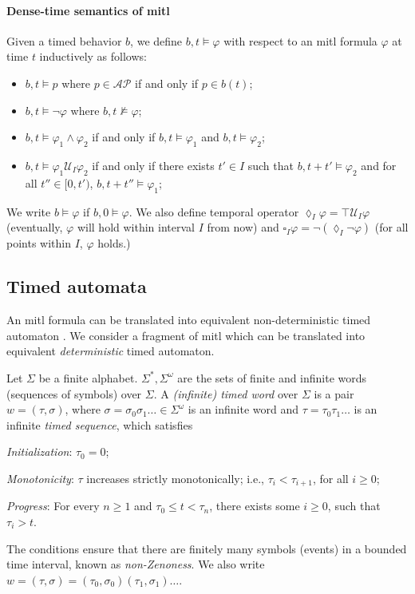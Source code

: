 \documentclass[letterpaper, 10 pt, conference]{ieeeconf}
\newcommand{\calU}{\mathcal{U}}
\newcommand{\calAP}{\mathcal{AP}}
\newcommand{\truev}{\top}
\begin{document}
\paragraph*{Dense-time semantics of \ac{mitl}} Given a timed behavior
$b$, we define $b,t \models \varphi$ with respect to an \ac{mitl}
formula $\varphi$ at time $t$ inductively as follows:
\begin{itemize}
\item $b,t\models p$ where $p\in \calAP$ if and only if $ p \in b(t)$;
\item $b,t \models \neg \varphi $ where $b,t \not \models \varphi$;
\item $b,t \models \varphi_1\land \varphi_2$ if and only if $b,t\models
  \varphi_1$ and $b,t\models \varphi_2$;
\item $b,t\models \varphi_1 \calU_I \varphi_2$ if and only if there
  exists $t'\in I$ such that $b,t+t' \models\varphi_2$ and for all
  $t''\in [0,t')$, $b, t+t'' \models \varphi_1$;
\end{itemize}
We write $b\models \varphi$ if $b, 0\models \varphi$. We also define
temporal operator $\lozenge_I \varphi= \truev \calU_I \varphi$
(eventually, $\varphi$ will hold within interval $I$ from now) and
$\square_I \varphi = \neg (\lozenge_I \neg \varphi)$ (for all
points within $I$, $\varphi$ holds.)


\subsection{Timed automata}
An \ac{mitl} formula can be translated into equivalent
non-deterministic timed automaton \cite{Alur1996}. We consider a
fragment of \ac{mitl} which can be translated into equivalent
\emph{deterministic} timed automaton.




Let $\Sigma$ be a finite alphabet. $\Sigma^\ast, \Sigma^\omega$ are
the sets of finite and infinite words (sequences of symbols) over
$\Sigma$. A \emph{(infinite) timed word} \cite{Alur1994183} over
$\Sigma$ is a pair $w=(\tau,\sigma)$, where
$\sigma=\sigma_0\sigma_1\ldots \in \Sigma^\omega$ is an infinite word
and $\tau= \tau_0\tau_1\ldots $ is an infinite \emph{timed sequence},
which satisfies \begin{inparaenum}[1)]
\item \emph{Initialization}: $\tau_0= 0$;
\item \emph{Monotonicity}: $\tau$ increases strictly monotonically;
  i.e., $\tau_i<\tau_{i+1}$, for all $i\ge 0$;
\item \emph{Progress}: For every $n \ge 1$ and
  $ \tau_0 \le t< \tau_n$, there exists some $i\ge 0$, such that
  $\tau_i>t$.
\end{inparaenum}
The conditions ensure that there are finitely many symbols (events) in
a bounded time interval, known as \emph{non-Zenoness}.  We also write
$w=(\tau,\sigma)= (\tau_0,\sigma_0)(\tau_1,\sigma_1)\ldots$.
\end{document}
